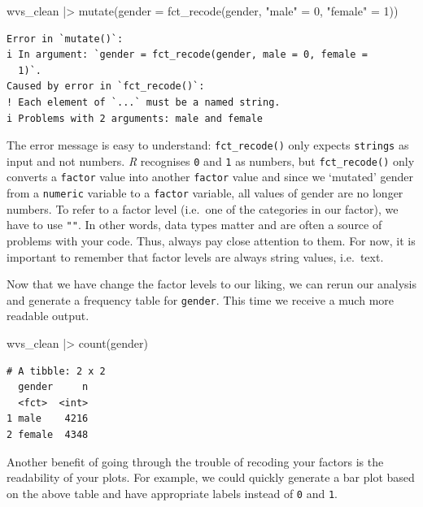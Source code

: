 \documentclass[
  letterpaper,
  DIV=11,
  numbers=noendperiod]{scrreprt}
\newenvironment{Shaded}{\begin{snugshade}}{\end{snugshade}}
\newcommand{\AttributeTok}[1]{\textcolor[rgb]{0.40,0.45,0.13}{#1}}
\newcommand{\DecValTok}[1]{\textcolor[rgb]{0.68,0.00,0.00}{#1}}
\newcommand{\FunctionTok}[1]{\textcolor[rgb]{0.28,0.35,0.67}{#1}}
\newcommand{\NormalTok}[1]{\textcolor[rgb]{0.00,0.23,0.31}{#1}}
\newcommand{\OtherTok}[1]{\textcolor[rgb]{0.00,0.23,0.31}{#1}}
\newcommand{\SpecialCharTok}[1]{\textcolor[rgb]{0.37,0.37,0.37}{#1}}
\newcommand{\StringTok}[1]{\textcolor[rgb]{0.13,0.47,0.30}{#1}}
\begin{document}
\begin{Shaded}
\begin{Highlighting}[]
\NormalTok{wvs\_clean }\SpecialCharTok{|\textgreater{}}
  \FunctionTok{mutate}\NormalTok{(}\AttributeTok{gender =} \FunctionTok{fct\_recode}\NormalTok{(gender,}
                             \StringTok{"male"} \OtherTok{=} \DecValTok{0}\NormalTok{,}
                             \StringTok{"female"} \OtherTok{=} \DecValTok{1}\NormalTok{))}
\end{Highlighting}
\end{Shaded}

\begin{verbatim}
Error in `mutate()`:
i In argument: `gender = fct_recode(gender, male = 0, female =
  1)`.
Caused by error in `fct_recode()`:
! Each element of `...` must be a named string.
i Problems with 2 arguments: male and female
\end{verbatim}

The error message is easy to understand: \texttt{fct\_recode()} only
expects \texttt{strings} as input and not numbers. \emph{R} recognises
\texttt{0} and \texttt{1} as numbers, but \texttt{fct\_recode()} only
converts a \texttt{factor} value into another \texttt{factor} value and
since we `mutated' gender from a \texttt{numeric} variable to a
\texttt{factor} variable, all values of gender are no longer numbers. To
refer to a factor level (i.e.~one of the categories in our factor), we
have to use \texttt{""}. In other words, data types matter and are often
a source of problems with your code. Thus, always pay close attention to
them. For now, it is important to remember that factor levels are always
string values, i.e.~text.

Now that we have change the factor levels to our liking, we can rerun
our analysis and generate a frequency table for \texttt{gender}. This
time we receive a much more readable output.

\begin{Shaded}
\begin{Highlighting}[]
\NormalTok{wvs\_clean }\SpecialCharTok{|\textgreater{}} \FunctionTok{count}\NormalTok{(gender)}
\end{Highlighting}
\end{Shaded}

\begin{verbatim}
# A tibble: 2 x 2
  gender     n
  <fct>  <int>
1 male    4216
2 female  4348
\end{verbatim}

Another benefit of going through the trouble of recoding your factors is
the readability of your plots. For example, we could quickly generate a
bar plot based on the above table and have appropriate labels instead of
\texttt{0} and \texttt{1}.
\end{document}
